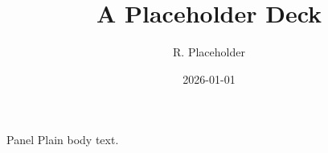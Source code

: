 \documentclass[aspectratio=169]{beamer}
\title{A Placeholder Deck}
\author{R. Placeholder}
\date{2026-01-01}
\begin{document}
\maketitle
\begin{frame}{Panel}
Plain body text.
\end{frame}
\end{document}
